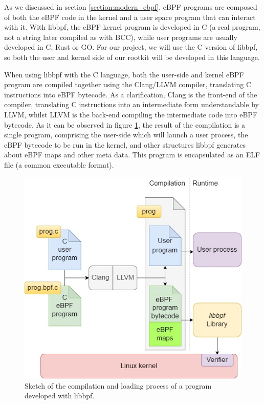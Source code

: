 \documentclass[12pt]{report} %
\begin{document}
As we discussed in section \ref{section:modern_ebpf}, eBPF programs are composed of both the eBPF code in the kernel and a user space program that can interact with it. With libbpf, the eBPF kernel program is developed in C (a real program, not a string later compiled as with BCC), while user programs are usually developed in C, Rust or GO. For our project, we will use the C version of libbpf, so both the user and kernel side of our rootkit will be developed in this language.

When using libbpf with the C language, both the user-side and kernel eBPF program are compiled together using the Clang/LLVM compiler, translating C instructions into eBPF bytecode. As a clarification, Clang is the front-end of the compiler, translating C instructions into an intermediate form understandable by LLVM, whilst LLVM is the back-end compiling the intermediate code into eBPF bytecode. As it can be observed in figure \ref{fig:libbpf}, the result of the compilation is a single program, comprising the user-side which will launch a user process, the eBPF bytecode to be run in the kernel, and other structures libbpf generates about eBPF maps and other meta data. This program is encapsulated as an ELF file (a common executable format).

\begin{figure}[H]
	\centering
	\includegraphics[width=12cm, keepaspectratio=true]{libbpf_prog.jpg}
	\caption{Sketch of the compilation and loading process of a program developed with libbpf.}
	\label{fig:libbpf}
\end{figure}
\end{document}
